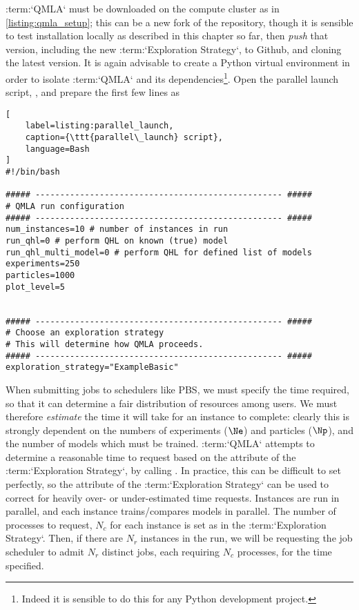 :term:`QMLA` must be downloaded on the compute cluster as in \cref{listing:qmla_setup};
    this can be a new fork of the repository, 
    though it is sensible to test installation locally as described in this chapter so far, 
    then \emph{push} that version, including the new :term:`Exploration Strategy`, to Github, 
    and cloning the latest version.
It is again advisable to create a Python virtual environment in order to isolate :term:`QMLA` 
    and its dependencies\footnote{Indeed it is sensible to do this for any Python development project.}.
Open the parallel launch script, , and prepare the first few lines as 

\begin{lstlisting}[
    label=listing:parallel_launch,
    caption={\ttt{parallel\_launch} script},
    language=Bash
]
#!/bin/bash

##### -------------------------------------------------- #####
# QMLA run configuration
##### -------------------------------------------------- #####
num_instances=10 # number of instances in run
run_qhl=0 # perform QHL on known (true) model
run_qhl_multi_model=0 # perform QHL for defined list of models
experiments=250
particles=1000
plot_level=5


##### -------------------------------------------------- #####
# Choose an exploration strategy 
# This will determine how QMLA proceeds. 
##### -------------------------------------------------- #####
exploration_strategy="ExampleBasic"
\end{lstlisting}    

\par 

When submitting jobs to schedulers like PBS, we must specify the time required, 
    so that it can determine a fair distribution of resources among users. 
We must therefore \emph{estimate} the time it will take for an instance to complete:
    clearly this is strongly dependent on the numbers of experiments ($\Ne$) and particles ($\Np$), 
    and the number of models which must be trained. 
:term:`QMLA` attempts to determine a reasonable time to request based on the 
    attribute of the :term:`Exploration Strategy`, by calling . 
In practice, this can be difficult to set perfectly,
    so the  attribute of the :term:`Exploration Strategy` can be used to correct 
    for heavily over- or under-estimated time requests. 
Instances are run in parallel, and each instance trains/compares models in parallel. 
The number of processes to request, $N_c$ for each instance is set as  
        in the :term:`Exploration Strategy`.
Then, if there are $N_r$ instances in the run, we will be requesting the job scheduler to admit 
    $N_r$ distinct jobs, each requiring $N_c$ processes, for the time specified. 

